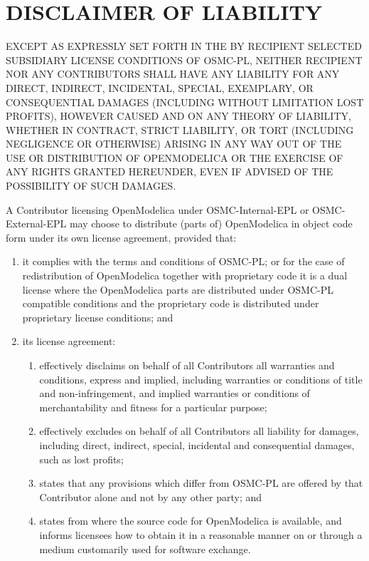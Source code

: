 \documentclass[a4paper, 12pt]{article}
\begin{document}
\section*{DISCLAIMER OF LIABILITY}

EXCEPT AS EXPRESSLY SET FORTH IN THE BY RECIPIENT SELECTED SUBSIDIARY LICENSE CONDITIONS OF OSMC-PL, NEITHER RECIPIENT NOR ANY CONTRIBUTORS SHALL HAVE ANY LIABILITY FOR ANY DIRECT, INDIRECT, INCIDENTAL, SPECIAL, EXEMPLARY, OR CONSEQUENTIAL DAMAGES (INCLUDING WITHOUT LIMITATION LOST PROFITS), HOWEVER CAUSED AND ON ANY THEORY OF LIABILITY, WHETHER IN CONTRACT, STRICT LIABILITY, OR TORT (INCLUDING NEGLIGENCE OR OTHERWISE) ARISING IN ANY WAY OUT OF THE USE OR DISTRIBUTION OF OPENMODELICA OR THE EXERCISE OF ANY RIGHTS GRANTED HEREUNDER, EVEN IF ADVISED OF THE POSSIBILITY OF SUCH DAMAGES.

\vspace{0.5cm}

A Contributor licensing OpenModelica under OSMC-Internal-EPL or OSMC-External-EPL may choose to distribute (parts of) OpenModelica in object code form under its own license agreement, provided that:

\begin{enumerate}[label=\alph*)]
\item it complies with the terms and conditions of OSMC-PL; or for the case of redistribution of OpenModelica together with proprietary code it is a dual license where the OpenModelica parts are distributed under OSMC-PL compatible conditions and the proprietary code is distributed under proprietary license conditions; and
\item its license agreement:
\begin{enumerate}[label=\roman*)]
\item effectively disclaims on behalf of all Contributors all warranties and conditions, express and implied, including warranties or conditions of title and non-infringement, and implied warranties or conditions of merchantability and fitness for a particular purpose;
\item effectively excludes on behalf of all Contributors all liability for damages, including direct, indirect, special, incidental and consequential damages, such as lost profits;
\item states that any provisions which differ from OSMC-PL are offered by that Contributor alone and not by any other party; and
\item states from where the source code for OpenModelica is available, and informs licensees how to obtain it in a reasonable manner on or through a medium customarily used for software exchange.
\end{enumerate}
\end{enumerate}
\end{document}
